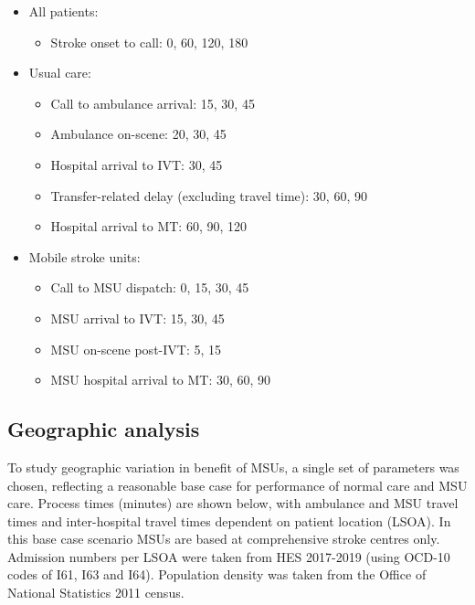 \begin{minipage}{1.0\textwidth}  %
\begin{spacing}{1.2}
\begin{itemize}
    \item All patients:
    \begin{itemize}
        \item Stroke onset to call: 0, 60, 120, 180
    \end{itemize}
    \item Usual care:
    \begin{itemize}
        \item Call to ambulance arrival: 15, 30, 45
        \item Ambulance on-scene: 20, 30, 45
        \item Hospital arrival to IVT: 30, 45
        \item Transfer-related delay (excluding travel time): 30, 60, 90
        \item Hospital arrival to MT: 60, 90, 120
    \end{itemize}
    \item Mobile stroke units:
    \begin{itemize}
        \item Call to MSU dispatch: 0, 15, 30, 45
        \item MSU arrival to IVT: 15, 30, 45
        \item MSU on-scene post-IVT: 5, 15
        \item MSU hospital arrival to MT: 30, 60, 90
    \end{itemize}
\end{itemize}
\end{spacing}
\end{minipage}


\subsection{Geographic analysis}

To study geographic variation in benefit of MSUs, a single set of parameters was chosen, reflecting a reasonable base case for performance of normal care and MSU care. Process times (minutes) are shown below, with ambulance and MSU travel times and inter-hospital travel times dependent on patient location (LSOA). In this base case scenario MSUs are based at comprehensive stroke centres only. Admission numbers per LSOA were taken from HES 2017-2019 (using OCD-10 codes of I61, I63 and I64). Population density was taken from the Office of National Statistics 2011 census.


